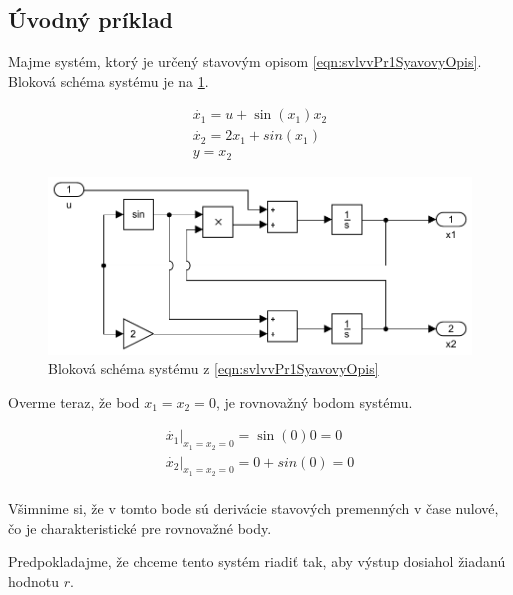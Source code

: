 


	\subsection{Úvodný príklad}
	
	Majme systém, ktorý je určený stavovým opisom \cref{eqn:svlvvPr1SyavovyOpis}. Bloková schéma systému je na \cref{fig:svlvvPr1BlockSchemaSystemu}.
	
	\begin{equation}
		\begin{gathered}
		\dot{x_1}  =u + \sin(x_1) x_2 \\
		\dot{x_2} = 2x_1 + sin(x_1) \\
		y = x_2
		\end{gathered}
		\label{eqn:svlvvPr1SyavovyOpis}
	\end{equation}
	
	\begin{figure}[h!]
		\centering
		\includegraphics[width=0.8\linewidth]{./figures/svlvvPr1Sys-crop}
		\caption{Bloková schéma systému z \cref{eqn:svlvvPr1SyavovyOpis}}
		\label{fig:svlvvPr1BlockSchemaSystemu}
	\end{figure}
	
	Overme teraz, že bod  $x_1 = x_2 = 0$, je rovnovažný bodom systému.
	
	\begin{equation*}
	\begin{gathered}
	\dot{x_1}|_{x_1 = x_2 = 0}  = \sin(0) 0 = 0 \\
	\dot{x_2}|_{x_1 = x_2 = 0} = 0 + sin(0) = 0 \\
	\end{gathered}
	\label{eqn:svlvvPr1OverenieRB}
	\end{equation*}
	
	Všimnime si, že v tomto bode sú derivácie stavových premenných v čase nulové, čo je charakteristické pre rovnovažné body.
	
	Predpokladajme, že chceme tento systém riadiť tak, aby výstup dosiahol žiadanú hodnotu $r$.
	
